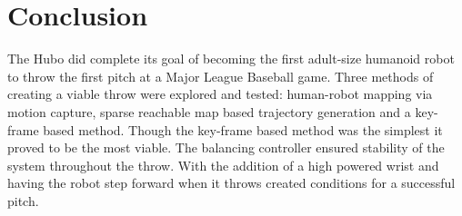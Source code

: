 \section{Conclusion}\label{sec:conclusion}
The Hubo did complete its goal of becoming the first adult-size humanoid robot to throw the first pitch at a Major League Baseball game.  Three methods of creating a viable throw were explored and tested: human-robot mapping via motion capture, sparse reachable map based trajectory generation and a key-frame based method.  Though the key-frame based method was the simplest it proved to be the most viable.  The balancing controller ensured stability of the system throughout the throw.  With the addition of a high powered wrist and having the robot step forward when it throws created conditions for a successful pitch.